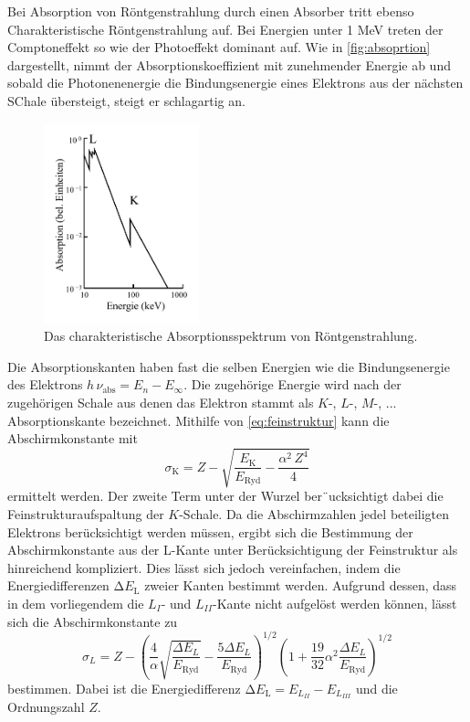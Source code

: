 Bei Absorption von Röntgenstrahlung durch einen Absorber tritt ebenso Charakteristische Röntgenstrahlung auf.
Bei Energien unter 1 MeV treten der Comptoneffekt so wie der Photoeffekt dominant auf. 
Wie in \autoref{fig:absoprtion} dargestellt, nimmt der Absorptionskoeffizient mit zunehmender Energie ab 
und sobald die Photonenenergie die Bindungsenergie eines Elektrons aus der nächsten SChale übersteigt, steigt er schlagartig an.
\begin{figure}[H]
    \centering
    \includegraphics[width=0.4\textwidth]{pictures/absorption.pdf}
    \caption{Das charakteristische Absorptionsspektrum von Röntgenstrahlung. \cite{v602}}
    \label{fig:absoprtion}
\end{figure}
Die Absorptionskanten haben fast die selben Energien wie die Bindungsenergie des Elektrons $h \, \nu_\text{abs} = E_n - E_{\infty}$.
Die zugehörige Energie wird nach der zugehörigen Schale aus denen das Elektron stammt als $K$-, $L$-, $M$-, ... Absorptionskante bezeichnet.
Mithilfe von \autoref{eq:feinstruktur} kann die Abschirmkonstante mit 
\begin{equation} \label{eq:sigma}
    \sigma_{\mathrm{K}}=Z-\sqrt{\frac{E_{\mathrm{K}}}{E_\text{Ryd}}-\frac{\alpha^{2} \, Z^{4}}{4}}
\end{equation}
ermittelt werden.
Der zweite Term unter der Wurzel ber¨ucksichtigt dabei die Feinstrukturaufspaltung der $K$-Schale.
Da die Abschirmzahlen jedel beteiligten Elektrons berücksichtigt werden müssen, 
ergibt sich die Bestimmung der Abschirmkonstante aus der L-Kante unter Berücksichtigung der Feinstruktur als hinreichend kompliziert.
Dies lässt sich jedoch vereinfachen, indem die Energiedifferenzen $\increment E_\text{L}$ zweier Kanten bestimmt werden.
Aufgrund dessen, dass in dem vorliegendem die $L_{I}$- und $L_{II}$-Kante nicht aufgelöst werden können, 
lässt sich die Abschirmkonstante zu 
\begin{equation}
    \sigma_{L}=Z-\left(\frac{4}{\alpha} \sqrt{\frac{\Delta E_{L}}{E_\text{Ryd}}}-\frac{5 \Delta E_{L}}{E_\text{Ryd}}\right)^{1 / 2}\left(1+\frac{19}{32} \alpha^{2} \frac{\Delta E_{L}}{E_\text{Ryd}}\right)^{1 / 2}
\end{equation}
bestimmen. 
Dabei ist die Energiedifferenz $\increment E_\text{L} = E_{L_{II}} - E_{L_{III}}$ und die Ordnungszahl $Z$.

